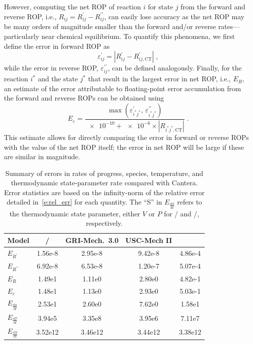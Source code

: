 \documentclass[12pt,number,sort&compress,preprint]{elsarticle}
\newcommand{\revise}[1]{{\sloppy\textcolor{RoyalPurple}{#1}}}  %
\begin{document}
However, computing the net ROP of reaction $i$ for state $j$ from the forward and reverse ROP, i.e., $R_{ij} = R_{ij}^{\prime} - R_{ij}^{\prime\prime}$, can easily lose accuracy as the net ROP may be many orders of magnitude smaller than the forward and\slash or reverse rates---particularly near chemical equilibrium.
To quantify this phenomena, we first define the error in forward ROP as
\begin{equation}
\varepsilon^{\prime}_{ij} = \left\lvert R_{ij}^{\prime} - R_{ij,\text{CT}}^{\prime} \right\rvert \;,
\end{equation}
while the error in reverse ROP, $\varepsilon^{\prime\prime}_{ij}$, can be defined analogously.
Finally, for the reaction $i^{*}$ and the state $j^{*}$ that result in the largest error in net ROP, i.e., $E_{R}$, an estimate of the error attributable to floating-point error accumulation from the forward and reverse ROPs can be obtained using
\begin{equation}
E_{\varepsilon} = \frac{\max(\varepsilon^{\prime}_{i^{*}j^{*}}\text{, }\varepsilon^{\prime\prime}_{i^{*}j^{*}})}{\num{e-10} + \num{e-6} \times \left\lvert R_{i^{*}j^{*},\text{CT}} \right\rvert} \;.
\end{equation}
This estimate allows for directly comparing the error in forward or reverse ROPs with the value of the net ROP itself; the error in net ROP will be large if these are similar in magnitude.

\begin{table}[htbp]
\centering
\begin{tabular}{@{}l S[table-format=1.2e1] S[table-format=1.2e1] S[table-format=1.2e1] S[table-format=1.2e1] @{}}
\toprule
{Model} & {\slash{}} & {GRI-Mech.~3.0} & {USC-Mech II} & {} \\
\midrule
$E_{R^{\prime}}$                    & 1.56e-8 & 2.95e-8 & 9.42e-8 & 4.86e-4 \\
$E_{R^{\prime\prime}}$              & 6.92e-8 & 6.53e-8 & 1.20e-7 & 5.07e-4 \\
$E_{R}$                             & 1.49e1  & 1.11e0  & 2.80e0  & 4.82e-1 \\
$E_{\varepsilon}$                   & 1.48e1  & 1.13e0  & 2.93e0  & 5.03e-1 \\
$E_{\frac{\text{d} n}{\text{d} t}}$ & 2.53e1  & 2.60e0  & 7.62e0  & 1.58e1 \\
$E_{\frac{\text{d} T}{\text{d} t}}$ & 3.94e5  & 3.35e8  & 3.95e6  & 7.11e7 \\
$E_{\frac{\text{d} S}{\text{d} t}}$ & 3.52e12 & 3.46e12 & 3.44e12 & 3.38e12 \\
\bottomrule
\end{tabular}
\caption{Summary of errors in rates of progress, species, temperature, and thermodynamic state-parameter rate \revise{compared with Cantera}.
Error statistics are based on the infinity-norm of the relative error detailed in~\cref{e:rel_err} for each quantity.
The ``S'' in $E_{\frac{\text{d} S}{\text{d} t}}$ refers to the thermodynamic state parameter, either $V$ or $P$ for \conp/ and \conv/, respectively.
}
\label{T:source_error}
\end{table}
\end{document}
